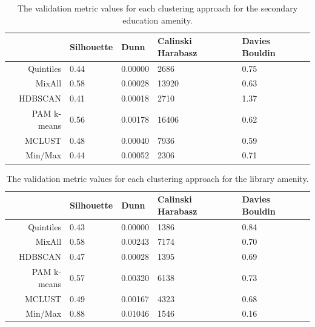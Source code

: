 \documentclass[11pt, a4paper]{article}
\begin{document}
\centering
\begin{longtable}[h]{|r|llll|}
\caption[Secondary education validation metrics]{The validation metric values for each clustering approach for the secondary education amenity.}\label{seceducvalid}
\endfirsthead
\endhead
  \hline
 & Silhouette & Dunn & Calinski Harabasz & Davies Bouldin \\ 
  \hline
Quintiles & 0.44 & 0.00000 &  2686 & 0.75 \\ 
   \hline
MixAll & \cellcolor{gray!25} 0.58 & 0.00028 & 13920 & 0.63 \\ 
   \hline
HDBSCAN & 0.41 & 0.00018 &  2710 & 1.37 \\ 
   \hline
PAM k-means & 0.56 & \cellcolor{gray!25} 0.00178 & \cellcolor{gray!25} 16406 & 0.62 \\ 
   \hline
MCLUST & 0.48 & 0.00040 &  7936 & \cellcolor{gray!25} 0.59 \\ 
   \hline
Min/Max & 0.44 & 0.00052 &  2306 & 0.71 \\ 
   \hline
\end{longtable}









\centering
\begin{longtable}[h]{|r|llll|}
\caption[Library validation metrics]{The validation metric values for each clustering approach for the library amenity.}\label{libraryvalid}
\endfirsthead
\endhead
 \hline
 & Silhouette & Dunn & Calinski Harabasz & Davies Bouldin \\ 
  \hline
Quintiles & 0.43 & 0.00000 & 1386 & 0.84 \\ 
   \hline
MixAll & 0.58 & 0.00243 & \cellcolor{gray!25} 7174 & 0.70 \\ 
   \hline
HDBSCAN & 0.47 & 0.00028 & 1395 & 0.69 \\ 
   \hline
PAM k-means & 0.57 & 0.00320 & 6138 & 0.73 \\ 
   \hline
MCLUST & 0.49 & 0.00167 & 4323 & 0.68 \\ 
   \hline
Min/Max & \cellcolor{gray!25} 0.88 & \cellcolor{gray!25} 0.01046 & 1546 & \cellcolor{gray!25} 0.16 \\ 
   \hline
\end{longtable}
\end{document}
